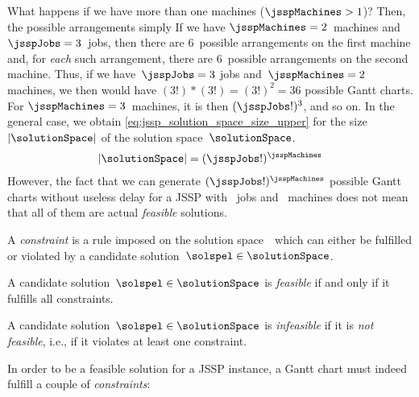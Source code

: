 What happens if we have more than one machines ($\jsspMachines>1$)?
Then, the possible arrangements simply 
If we have $\jsspMachines=2$~machines and $\jsspJobs=3$~jobs, then there are 6~possible arrangements on the first machine and, for \emph{each} such arrangement, there are 6~possible arrangements on the second machine.
Thus, if we have~$\jsspJobs=3$ jobs and~$\jsspMachines=2$ machines, we then would have $(3!)*(3!)=(3!)^2=36$ possible Gantt charts.
For $\jsspMachines=3$~machines, it is then $(\jsspJobs!)^3$, and so on.
In the general case, we obtain \autoref{eq:jssp_solution_space_size_upper} for the size~$\left|\solutionSpace\right|$ of the solution space~$\solutionSpace$.%
%
\begin{align}%
\left|\solutionSpace\right| = (\jsspJobs!)^{\jsspMachines}%
\label{eq:jssp_solution_space_size_upper}%
\end{align}%
%
However, the fact that we can generate $(\jsspJobs!)^{\jsspMachines}$ possible Gantt charts without useless delay for a \gls{JSSP} with \jsspJobs~jobs and \jsspMachines~machines does not mean that all of them are actual \emph{feasible} solutions.%
%
\endhsection%
%
%
\label{sec:solutionSpace:feasibility}%
%
\begin{definition}%
\label{def:constraint}%
A \emph{constraint} is a rule imposed on the solution space~\solutionSpace\ which can either be fulfilled or violated by a candidate solution~$\solspel\in\solutionSpace$.%
\end{definition}%
%
\begin{definition}%
\label{def:feasibility}%
A candidate solution~$\solspel\in\solutionSpace$ is \emph{feasible} if and only if it fulfills all constraints.%
\end{definition}%
%
\begin{definition}%
\label{def:infeasibility}%
A candidate solution~$\solspel\in\solutionSpace$ is \emph{infeasible} if it is \emph{not feasible}, i.e., if it violates at least one constraint.%
\end{definition}%
%
In order to be a feasible solution for a \gls{JSSP} instance, a Gantt chart must indeed fulfill a couple of \emph{constraints}:%
%
